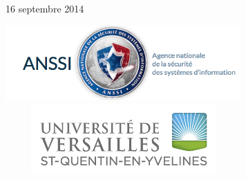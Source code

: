 \documentclass[a4paper]{article} %
\numberwithin{section}{part}
\numberwithin{equation}{section}
\begin{document}
\begin{titlepage}


\begin{center}
{\large 16 septembre 2014}\\[1cm] %
\end{center}


\begin{center}
\includegraphics[width=9cm]{136704} %
\includegraphics[width=9cm, height=2.7cm]{uvsq-logo-rvb-def}\\
\end{center}
 

\vfill %
\end{titlepage}
\newpage
\end{document}
